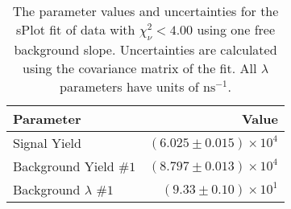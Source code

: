 
\begin{table}[ht]
    \begin{center}
        \begin{tabular}{lr}\toprule
            Parameter & Value \\\midrule
            Signal Yield & $(6.025 \pm 0.015) \times 10^{4}$ \\
            Background Yield $\#1$ & $(8.797 \pm 0.013) \times 10^{4}$ \\
            Background $\lambda$ $\#1$ & $(9.33 \pm 0.10) \times 10^{1}$ \\\bottomrule
        \end{tabular}
        \caption{The parameter values and uncertainties for the sPlot fit of data with $\chi^2_\nu < 4.00$ using one free background slope. Uncertainties are calculated using the covariance matrix of the fit. All $\lambda$ parameters have units of $\si{\nano\second}^{-1}$.}\label{tab:splot-fit-results-chisqdof-4.00-free-1}
    \end{center}
\end{table}
